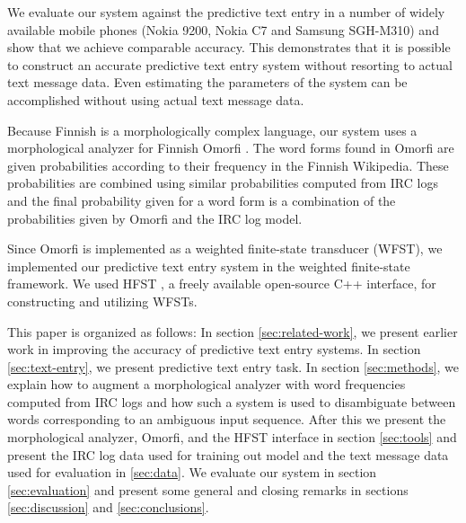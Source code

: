 \documentclass[a4paper,conference]{IEEEtran}
\begin{document}
We evaluate our system against the predictive text entry in a number
of widely available mobile phones (Nokia 9200, Nokia C7 and Samsung
SGH-M310) and show that we achieve comparable accuracy. This
demonstrates that it is possible to construct an accurate predictive
text entry system without resorting to actual text message data. Even
estimating the parameters of the system can be accomplished without
using actual text message data.

Because Finnish is a morphologically complex language, our system uses
a morphological analyzer for Finnish Omorfi 
\cite{pirinen/2011/nodalida}. The word forms found in Omorfi are given
probabilities according to their frequency in the Finnish
Wikipedia. These probabilities are combined using similar
probabilities computed from IRC logs and the final probability given
for a word form is a combination of the probabilities given by Omorfi
and the IRC log model.

Since Omorfi is implemented as a weighted finite-state transducer
(WFST), we implemented our predictive text entry system in the
weighted finite-state framework. We used HFST
\cite{conf/sfcm/Linden2009}, a freely available open-source C++
interface, for constructing and utilizing WFSTs.

This paper is organized as follows: In section \ref{sec:related-work},
we present earlier work in improving the accuracy of predictive text
entry systems. In section \ref{sec:text-entry}, we present predictive
text entry task. In section \ref{sec:methods}, we explain how to
augment a morphological analyzer with word frequencies computed from
IRC logs and how such a system is used to disambiguate between words
corresponding to an ambiguous input sequence. After this we present
the morphological analyzer, Omorfi, and the HFST interface in section
\ref{sec:tools} and present the IRC log data used for training out
model and the text message data used for evaluation in
\ref{sec:data}. We evaluate our system in section \ref{sec:evaluation}
and present some general and closing remarks in sections
\ref{sec:discussion} and \ref{sec:conclusions}.

\end{document}
